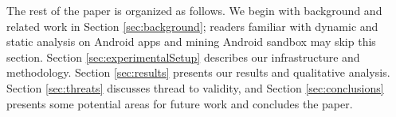 


The rest of the paper is organized as follows. We begin with background and related work in Section \ref{sec:background};
readers familiar with dynamic and static analysis on Android apps and mining Android sandbox may skip this section.
Section \ref{sec:experimentalSetup} describes our infrastructure and methodology. Section \ref{sec:results} presents our results and qualitative analysis. Section \ref{sec:threats} discusses thread to validity, and Section \ref{sec:conclusions} 
presents some potential areas for future work and concludes the paper.

